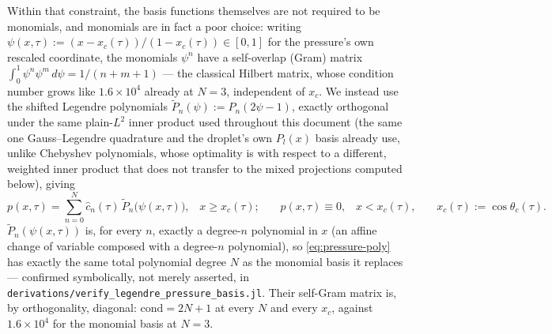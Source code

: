 Within that constraint, the basis functions themselves are not required to be monomials, and monomials are in fact a poor choice: writing $\psi(x,\tau):=(x-x_c(\tau))/(1-x_c(\tau))\in[0,1]$ for the pressure's own rescaled coordinate, the monomials $\psi^n$ have a self-overlap (Gram) matrix $\int_0^1\psi^n\psi^m\,d\psi=1/(n+m+1)$ --- the classical Hilbert matrix, whose condition number grows like $1.6\times10^4$ already at $N=3$, independent of $x_c$. We instead use the shifted Legendre polynomials $\tilde P_n(\psi):=P_n(2\psi-1)$, exactly orthogonal under the same plain-$L^2$ inner product used throughout this document (the same one Gauss--Legendre quadrature and the droplet's own $P_l(x)$ basis already use, unlike Chebyshev polynomials, whose optimality is with respect to a different, weighted inner product that does not transfer to the mixed projections computed below), giving
\begin{equation}
    p(x,\tau) = \sum_{n=0}^{N} \hat c_n(\tau)\, \tilde P_n\big(\psi(x,\tau)\big)\text{,}\quad x\ge x_c(\tau)\text{;}\qquad
    p(x,\tau) \equiv 0\text{,}\quad x<x_c(\tau)\text{,}\qquad x_c(\tau):=\cos\theta_c(\tau)\text{.}
    \label{eq:pressure-poly}
\end{equation}
$\tilde P_n(\psi(x,\tau))$ is, for every $n$, exactly a degree-$n$ polynomial in $x$ (an affine change of variable composed with a degree-$n$ polynomial), so \eqref{eq:pressure-poly} has exactly the same total polynomial degree $N$ as the monomial basis it replaces --- confirmed symbolically, not merely asserted, in \texttt{derivations/verify\_legendre\_pressure\_basis.jl}. Their self-Gram matrix is, by orthogonality, diagonal: $\mathrm{cond}=2N+1$ at every $N$ and every $x_c$, against $1.6\times10^4$ for the monomial basis at $N=3$.

